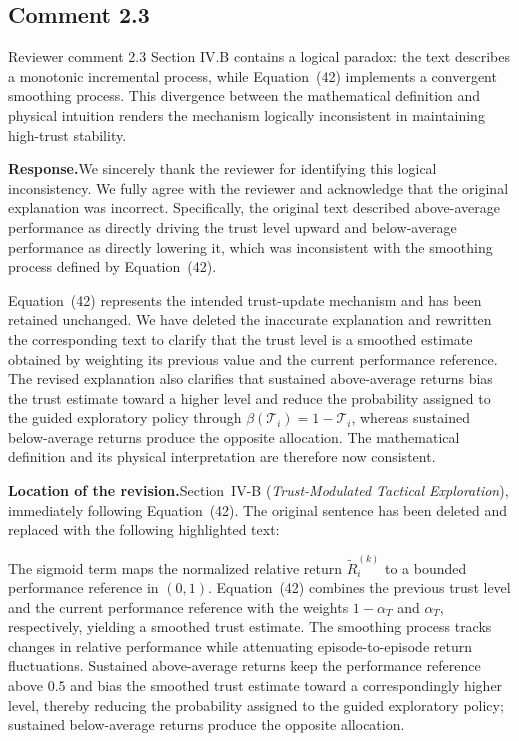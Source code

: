 \documentclass[11pt]{article}
\newcommand{\rsp}{\medskip\noindent\textbf{Response.}\quad}
\newcommand{\loc}{\medskip\noindent\textbf{Location of the revision.}\quad}
\begin{document}



\subsection*{Comment 2.3}

\begin{reviewercomment}{Reviewer comment 2.3}
Section IV.B contains a logical paradox: the text describes a monotonic
incremental process, while Equation~(42) implements a convergent smoothing
process. This divergence between the mathematical definition and physical
intuition renders the mechanism logically inconsistent in maintaining
high-trust stability.
\end{reviewercomment}

\rsp We sincerely thank the reviewer for identifying this logical
inconsistency. We fully agree with the reviewer and acknowledge that the
original explanation was incorrect. Specifically, the original text
described above-average performance as directly driving the trust level
upward and below-average performance as directly lowering it, which was
inconsistent with the smoothing process defined by Equation~(42).

Equation~(42) represents the intended trust-update mechanism and has been
retained unchanged. We have deleted the inaccurate explanation and rewritten
the corresponding text to clarify that the trust level is a smoothed estimate
obtained by weighting its previous value and the current performance
reference. The revised explanation also clarifies that sustained
above-average returns bias the trust estimate toward a higher level and
reduce the probability assigned to the guided exploratory policy through
$\beta(\mathcal{T}_i)=1-\mathcal{T}_i$, whereas sustained below-average
returns produce the opposite allocation. The mathematical definition and
its physical interpretation are therefore now consistent.

\loc Section~IV-B (\emph{Trust-Modulated Tactical Exploration}), immediately
following Equation~(42). The original sentence has been deleted and replaced
with the following highlighted text:

\begin{manuscripttext}
The sigmoid term maps the normalized relative return
$\tilde{R}_i^{(k)}$ to a bounded performance reference in $(0,1)$.
Equation~(42) combines the previous trust level and the current performance
reference with the weights $1-\alpha_T$ and $\alpha_T$, respectively,
yielding a smoothed trust estimate. The smoothing process tracks changes in
relative performance while attenuating episode-to-episode return
fluctuations. Sustained above-average returns keep the performance reference
above $0.5$ and bias the smoothed trust estimate toward a correspondingly
higher level, thereby reducing the probability assigned to the guided
exploratory policy; sustained below-average returns produce the opposite
allocation.
\end{manuscripttext}
\end{document}
